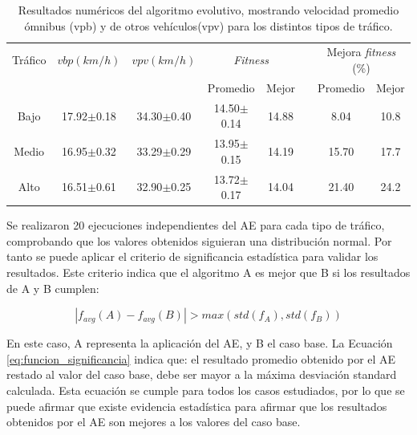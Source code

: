 \begin{table}[H]
	\renewcommand{\arraystretch}{1.2}	
		\centering
	\caption[Resultados numéricos del AE]{Resultados numéricos del algoritmo evolutivo, mostrando velocidad promedio ómnibus (vpb) y de otros vehículos(vpv) para los distintos tipos de tráfico. }
	\label{table:resultado_caso_algoritmo}
	\begin{tabular}{cccccccc}
		\hline 
		Tráfico& 
		$vbp(km/h)$& 
		$vpv(km/h)$&
		\multicolumn{2}{c}{\emph{Fitness}}&  & 
		\multicolumn{2}{c}{Mejora \emph{fitness} (\%)}\\  \cline{4-5} \cline{7-8}&     &     & \multicolumn{1}{c}{Promedio} & \multicolumn{1}{c}{Mejor} &  & \multicolumn{1}{c}{Promedio} & \multicolumn{1}{c}{Mejor} \\ \hline
		Bajo & 17.92$\pm$0.18 & 34.30$\pm$0.40 & 14.50$\pm$0.14 & 14.88 & & 8.04 & 10.8  \\
		Medio& 16.95$\pm$0.32 & 33.29$\pm$0.29 & 13.95$\pm$0.15 & 14.19 & & 15.70& 17.7\\ 
		Alto & 16.51$\pm$0.61  & 32.90$\pm$0.25& 13.72$\pm$0.17 & 14.04 & & 21.40& 24.2\\	
		\hline	    
	\end{tabular}
\end{table}

Se realizaron 20 ejecuciones independientes del AE para cada tipo de tráfico, comprobando que los valores obtenidos siguieran una distribución normal. Por tanto se puede aplicar el criterio de significancia estadística para validar los resultados. Este criterio indica que el
algoritmo A es mejor que B si los resultados de A y B cumplen:

\begin{equation}
\label{eq:funcion_significancia}
\left |f_{avg}(A) - f_{avg}(B)  \right | > max(std(f_A),std(f_B))
\end{equation}

En este caso, A representa la aplicación del AE, y B el caso base. La Ecuación \ref{eq:funcion_significancia} indica que: el resultado promedio obtenido por el AE restado al valor del caso base, debe ser mayor a la máxima desviación standard calculada. Esta ecuación se cumple para todos los casos estudiados, por lo que se puede afirmar que existe evidencia estadística para afirmar que los resultados obtenidos por el AE son mejores a los valores del caso base.

